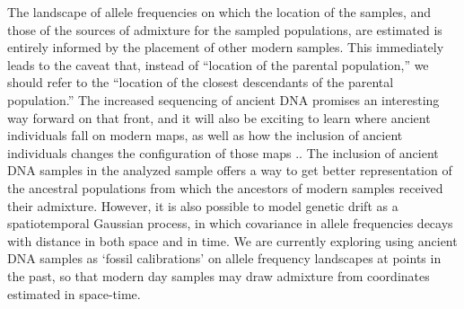 \documentclass[12pt]{article}
\begin{document}
The landscape of allele frequencies on which the location of the samples, 
and those of the sources of admixture for the sampled populations, 
are estimated is entirely informed by the placement of other modern samples.  
This immediately leads to the caveat that, instead of ``location of the parental population,''
we should refer to the ``location of the closest descendants of the parental population.''
The increased sequencing of ancient DNA \citep[see ][for a recent review]{pickrell_reich:14} promises an interesting way forward on that front,
and it will also be exciting to learn where ancient individuals fall on modern maps, 
as well as how the inclusion of ancient individuals changes the configuration of those maps \citep{skoglund_investigating_2014}..
The inclusion of ancient DNA samples in the analyzed sample offers a way to get better representation of the ancestral populations from which the ancestors of modern samples received their admixture.  
However, it is also possible to model genetic drift as a spatiotemporal Gaussian process, 
in which covariance in allele frequencies decays with distance in both space and in time.  
We are currently exploring using ancient DNA samples as  `fossil calibrations' on allele frequency landscapes at points in the past, 
so that modern day samples may draw admixture from coordinates estimated in space-time.


\end{document}
